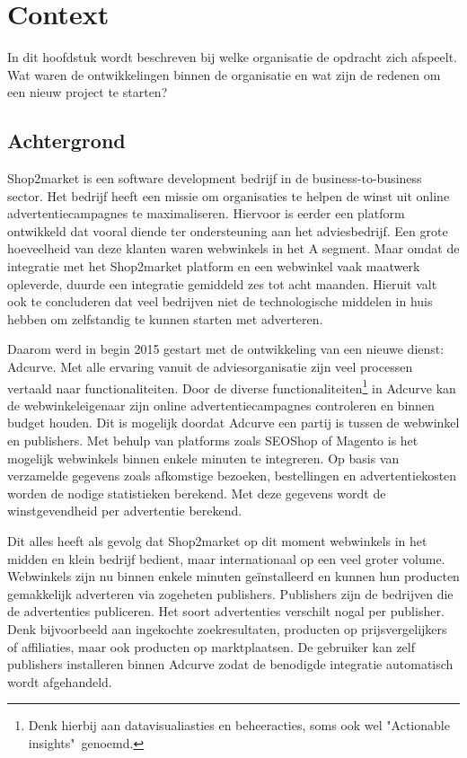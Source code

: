 \chapter{Context}
In dit hoofdstuk wordt beschreven bij welke organisatie de opdracht zich afspeelt. Wat waren de ontwikkelingen binnen de organisatie en wat zijn de redenen om een nieuw project te starten?

\section{Achtergrond}
\label{sec:achtergrond}

Shop2market is een software development bedrijf in de business-to-business sector. Het bedrijf heeft een missie om organisaties te helpen de winst uit online advertentiecampagnes te maximaliseren. Hiervoor is eerder een platform ontwikkeld dat vooral diende ter ondersteuning aan het adviesbedrijf. Een grote hoeveelheid van deze klanten waren webwinkels in het A segment. Maar omdat de integratie met het Shop2market platform en een webwinkel vaak maatwerk opleverde, duurde een integratie gemiddeld zes tot acht maanden. Hieruit valt ook te concluderen dat veel bedrijven niet de technologische middelen in huis hebben om zelfstandig te kunnen starten met adverteren.

Daarom werd in begin 2015 gestart met de ontwikkeling van een nieuwe dienst: Adcurve. Met alle ervaring vanuit de adviesorganisatie zijn veel processen vertaald naar functionaliteiten. Door de diverse functionaliteiten\footnote{ Denk hierbij aan datavisualiasties en beheeracties, soms ook wel "Actionable insights"\  genoemd.} in Adcurve kan de webwinkeleigenaar zijn online advertentiecampagnes controleren en binnen budget houden. Dit is mogelijk doordat Adcurve een partij is tussen de webwinkel en publishers. Met behulp van platforms zoals SEOShop of Magento is het mogelijk webwinkels binnen enkele minuten te integreren. 
Op basis van verzamelde gegevens zoals afkomstige bezoeken, bestellingen en advertentiekosten worden de nodige statistieken berekend. Met deze gegevens wordt de winstgevendheid per advertentie berekend.


Dit alles heeft als gevolg dat Shop2market op dit moment webwinkels in het midden en klein bedrijf  bedient, maar internationaal op een veel groter volume. Webwinkels zijn nu binnen enkele minuten geïnstalleerd en kunnen hun producten gemakkelijk adverteren via zogeheten publishers. Publishers zijn de bedrijven die de advertenties publiceren. Het soort advertenties verschilt nogal per publisher. Denk bijvoorbeeld aan ingekochte zoekresultaten, producten op prijsvergelijkers of affiliaties, maar ook producten op marktplaatsen. De gebruiker kan zelf publishers installeren binnen Adcurve zodat de benodigde integratie automatisch wordt afgehandeld. 

